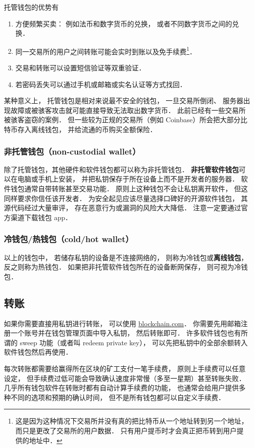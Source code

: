 托管钱包的优势有
\begin{enumerate}
\item 方便频繁买卖： 例如法币和数字货币的兑换， 或者不同数字货币之间的兑换．
\item 同一交易所的用户之间转账可能会实时到账以及免手续费\footnote{这是因为这种情况下交易所并没有真的把比特币从一个地址转到另一个地址， 而只是更改了交易所的用户数据． 只有用户提币时才会真正把币转到用户提供的地址中．}．
\item 交易和转账可以设置短信验证等双重验证．
\item 若密码丢失可以通过手机或邮箱或实名认证等方式找回．
\end{enumerate}
某种意义上， 托管钱包是相对来说最不安全的钱包， 一旦交易所倒闭、 服务器出现故障或被骇客攻击就可能直接导致无法取出数字货币． 此前已经有一些交易所被骇客盗窃的案例． 但一些较为正规的交易所（例如 Coinbase）所会把大部分比特币存入离线钱包， 并给流通的币购买全额保险．

\subsubsection{非托管钱包（non-custodial wallet）}
除了托管钱包，其他硬件和软件钱包都可以称为非托管钱包． \textbf{非托管软件钱包}可以在电脑或手机上安装， 并把私钥保存于所在设备上而不是开发者的服务器． 软件钱包通常自带转账甚至交易功能． 原则上这种钱包不会让私钥离开软件， 但这同样要求你信任该开发者． 为安全起见应该尽量选择口碑好的开源软件钱包， 其源代码经过大量审评， 存在恶意行为或漏洞的风险大大降低． 注意一定要通过官方渠道下载钱包 app．

\subsubsection{冷钱包/热钱包（cold/hot wallet）}
以上的钱包中， 若储存私钥的设备是不连接网络的， 则称为冷钱包或\textbf{离线钱包}， 反之则称为热钱包． 如果把非托管软件钱包所在的设备断网保存， 则可视为冷钱包．


\subsection{转账}
如果你需要直接用私钥进行转账， 可以使用 \href{https://blockchain.com}{blockchain.com}． 你需要先用邮箱注册一个账号并在钱包管理页面中导入私钥， 然后转账即可． 许多软件钱包也有所谓的 sweep 功能（或者叫 redeem private key）， 可以先把私钥中的全部余额转入软件钱包然后再使用．

每次转账都需要给赢得所在区块的矿工支付一笔手续费， 原则上手续费可以任意设定， 但手续费过低可能会导致确认速度非常慢（多至一星期）甚至转账失败． 几乎所有钱包软件在转账时都有自动计算手续费的功能， 也通常会给用户提供多种不同的选项和预期的确认时间， 但不是所有钱包都可以自定义手续费．

